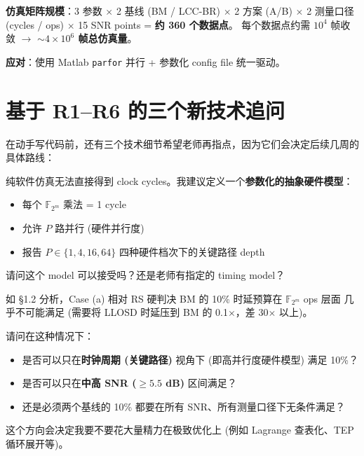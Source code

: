 \documentclass[11pt,a4paper]{article}
\begin{document}
\textbf{仿真矩阵规模}：3 参数 $\times$ 2 基线 (BM / LCC-BR) $\times$ 2 方案 (A/B) $\times$
2 测量口径 (cycles / ops) $\times$ 15 SNR points = \textbf{约 360 个数据点}。
每个数据点约需 $10^4$ 帧收敛 $\to$ \textbf{$\sim 4\times 10^6$ 帧总仿真量}。

\textbf{应对}：使用 Matlab \texttt{parfor} 并行 + 参数化 config file 统一驱动。

\section{基于 R1--R6 的三个新技术追问}

在动手写代码前，还有三个技术细节希望老师再指点，因为它们会决定后续几周的具体路线：

\begin{actionbox}[title=\textbf{Q7. Clock cycle 测量的 hardware timing model}]
纯软件仿真无法直接得到 clock cycles。我建议定义一个\textbf{参数化的抽象硬件模型}：

\begin{itemize}[leftmargin=1em, itemsep=1pt, topsep=2pt]
\item 每个 $\mathbb{F}_{2^m}$ 乘法 = 1 cycle
\item 允许 $P$ 路并行 (硬件并行度)
\item 报告 $P \in \{1, 4, 16, 64\}$ 四种硬件档次下的关键路径 depth
\end{itemize}

请问这个 model 可以接受吗？还是老师有指定的 timing model？
\end{actionbox}

\begin{actionbox}[title=\textbf{Q8. Case (a) 的可行性策略}]
如 §1.2 分析，Case (a) 相对 RS 硬判决 BM 的 10\% 时延预算在 $\mathbb{F}_{2^m}$ ops 层面
几乎不可能满足 (需要将 LLOSD 时延压到 BM 的 0.1$\times$，差 30$\times$ 以上)。

请问在这种情况下：
\begin{itemize}[leftmargin=1em, itemsep=1pt, topsep=2pt]
\item [(a)] 是否可以只在\textbf{时钟周期 (关键路径)} 视角下 (即高并行度硬件模型) 满足 10\%？
\item [(b)] 是否可以只在\textbf{中高 SNR ($\geq 5.5$ dB)} 区间满足？
\item [(c)] 还是必须两个基线的 10\% 都要在所有 SNR、所有测量口径下无条件满足？
\end{itemize}

这个方向会决定我要不要花大量精力在极致优化上 (例如 Lagrange 查表化、TEP 循环展开等)。
\end{actionbox}
\end{document}
